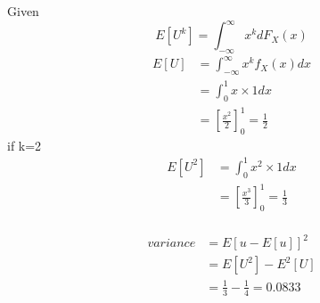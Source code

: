 \documentclass[journal,12pt,twocolumn]{IEEEtran}
\begin{document}
%
Given
$$E[U^{k}] = \int_{-\infty} ^{\infty} x^{k}dF_X (x)$$
     \begin{align*}
        E[U] &= \int_{-\infty} ^{\infty} x^{k}f_X (x) dx \\
           &= \int_{0} ^{1} x \times 1 dx \\
           &= \left[\frac{x^2}{2}\right]_{0} ^{1} = \frac{1}{2}
     \end{align*} 
if k=2 
       \begin{align*}
          E[U^2] &= \int_{0} ^{1} x^{2}\times 1 dx \\
          &= \left[\frac{x^3}{3}\right]_{0} ^{1} = \frac{1}{3}
          \end{align*}\\
      \begin{align*}
    variance &= E[u-E[u]]^{2} \\
    &= E[U^{2}]-E^{2}[U] \\
    &= \frac{1}{3} - \frac{1}{4} = 0.0833 \\
     \end{align*}
    
\end{document}

